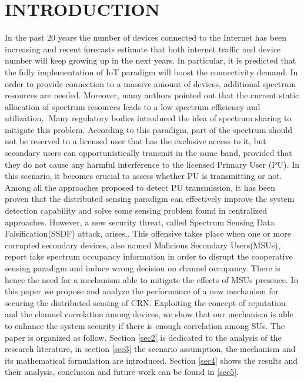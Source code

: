 \documentclass[letterpaper, 10 pt, conference]{ieeeconf}  %
\begin{document}
\section{INTRODUCTION}
In the past 20 years the number of devices connected to the Internet has been increasing and recent forecasts estimate that both internet traffic and device number will keep growing up in the next years. In particular, it is predicted that the fully implementation of IoT paradigm will boost the connectivity demand\cite{cisco}. In order to provide connection to a massive amount of devices, additional spectrum resources are needed\cite{khasawneh}. 
Moreover, many authors pointed out that the current static allocation of spectrum resources leads to a low spectrum efficiency and utilization\cite{kha13},\cite{leon}. Many regulatory bodies introduced the idea of spectrum sharing\cite{peha} to mitigate this problem.
According to this paradigm, part of the spectrum should not be reserved to a licensed user that has the exclusive access to it, but secondary users can opportunistically transmit in the same band, provided that they do not cause any harmful interference to the licensed Primary User (PU)\cite{rome}. In this scenario, it becomes crucial to assess whether PU is transmitting or not. 
Among all the approaches proposed to detect PU transmission, it has been proven that the distributed sensing paradigm can effectively improve the system detection capability and solve some sensing problem found in centralized approaches\cite{leon}. However, a new security threat, called Spectrum Sensing Data Falsification(SSDF) attack, arises\cite{cabric},\cite{khasawneh}. This offensive takes place when one or more corrupted secondary devices, also named Malicious Secondary Users(MSUs), report fake spectrum occupancy information in order to disrupt the cooperative sensing paradigm and induce wrong decision on channel occupancy\cite{leon}. 
There is hence the need for a mechanism able to mitigate the effects of MSUs presence. In this paper we propose and analyze the performance of a new mechanism for securing the distributed sensing of CRN. Exploiting the concept of reputation and the channel correlation among devices, we show that our mechanism is able to enhance the system security if there is enough correlation among SUs. The paper is organized as follow. Section \ref{sec2} is dedicated to the analysis of the research literature, in section \ref{sec3} the scenario assumption, the mechanism and its mathematical formulation are introduced. Section \ref{sec4} shows the results and their analysis, conclusion and future work can be found in \ref{sec5}.
\end{document}
